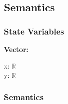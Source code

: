 \documentclass[12pt]{article}
\newcommand{\R}{$\mathbb{R}$}
\begin{document}
\subsection{Semantics}

\subsubsection{State Variables} \label{SecSVVector}
\textbf{Vector:} 
\begin{multicols}{2}
	\noindent x: \R \\
	y: \R
\end{multicols}



\subsubsection{Semantics} \label{SecAPSVector}
\end{document}
